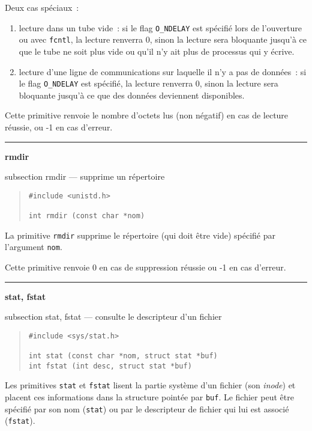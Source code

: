 \documentclass [twoside] {report}
\newcommand {\primitive} [1]
    {
	\phantomsection
	{\large \bf #1}
	\addcontentsline {toc} {subsection} {#1}
    }
\newcommand {\separation}
    {
	\vspace {5mm}
	\nopagebreak
	\hrule
    }
\begin{document}
Deux cas spéciaux~:

\begin {enumerate}
    \item lecture dans un tube vide~: si le flag {\tt O\_NDELAY}
	est spécifié lors de l'ouverture ou avec {\tt fcntl},
	la lecture renverra 0, sinon la lecture
	sera bloquante jusqu'à ce que le tube ne soit plus
	vide ou qu'il n'y ait plus de processus qui y écrive.
    \item lecture d'une ligne de communications sur
	laquelle il n'y a pas de données~: si le flag {\tt O\_NDELAY}
	est spécifié, la lecture renverra 0, sinon la lecture
	sera bloquante jusqu'à ce que des données
	deviennent disponibles.
\end {enumerate}

Cette primitive renvoie le nombre d'octets lus
(non négatif) en cas de lecture
réussie, ou -1 en cas d'erreur.




\separation
\primitive {rmdir} --- supprime un répertoire

\begin {quote}
\begin {verbatim}
#include <unistd.h>

int rmdir (const char *nom)
\end{verbatim}
\end {quote}

La primitive {\tt rmdir} supprime le répertoire (qui doit être vide)
spécifié par l'argument {\tt nom}.

Cette primitive renvoie 0 en cas de suppression réussie
ou -1 en cas d'erreur.




\separation
\primitive {stat, fstat} --- consulte le descripteur d'un fichier
    \label {stat}

\begin {quote}
\begin {verbatim}
#include <sys/stat.h>

int stat (const char *nom, struct stat *buf)
int fstat (int desc, struct stat *buf)
\end{verbatim}
\end {quote}

Les primitives {\tt stat} et {\tt fstat} lisent la partie système d'un
fichier (son {\it inode}) et placent ces informations dans la structure
pointée par {\tt buf}. Le fichier peut être spécifié par son nom
({\tt stat}) ou par le descripteur de fichier qui lui est associé
({\tt fstat}).
\end{document}

